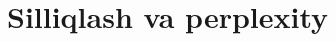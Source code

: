 \documentclass[aspectratio=169,11pt]{beamer}
\begin{document}
\section[Silliqlash]{Silliqlash va perplexity}

\end{document}
